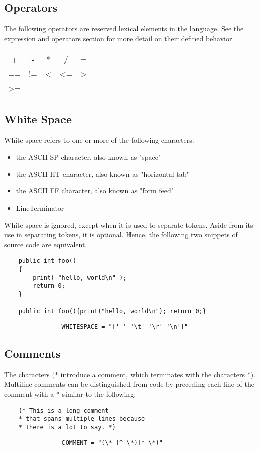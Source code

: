 \begin{homeworkProblem}
	\subsection{Operators}
	The following operators are reserved lexical elements in the language. See the expression and operators section for more detail on their defined behavior.
	\begin{center}
		\begin{tabular}{ccccc}
			+ & - & * & / & = \\
			== & != & \textless & \textless= & \textgreater \\
			\textgreater= 
		\end{tabular}
	\end{center}
 	
	\subsection{White Space}
	White space refers to one or more of the following characters:
	\begin{itemize}
		\item the ASCII SP character, also known as "space"
		\item the ASCII HT character, also known as "horizontal tab"
		\item the ASCII FF character, also known as "form feed"
		\item LineTerminator
	\end{itemize}
	White space is ignored, except when it is used to separate tokens. Aside from its use in separating tokens, it is optional. Hence, the following two snippets of source code are equivalent.
	
	\begin{verbatim}
	public int foo()
	{
		print( "hello, world\n" );
		return 0;
	}
	
	public int foo(){print("hello, world\n"); return 0;}
	\end{verbatim}
	
	\begin{verbatim}
				WHITESPACE = "[' ' '\t' '\r' '\n']"
 	\end{verbatim}
	
	\subsection{Comments}
    The characters $(*$ introduce a comment, which terminates with the characters $*)$.
	Multiline comments can be distinguished from code by preceding each line of the comment with a * similar to the following:
	\begin{verbatim}
	(* This is a long comment 
	* that spans multiple lines because
	* there is a lot to say. *)
	\end{verbatim}

	\begin{verbatim}
				COMMENT = "(\* [^ \*)]* \*)"
	\end{verbatim}

\end{homeworkProblem}
